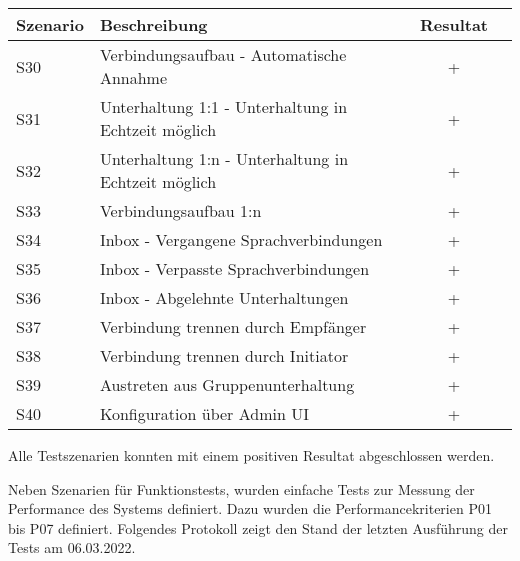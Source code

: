 \begin{table}[h]
    \centering
    \begin{tabular}{|l|p{11cm}|c|c|}
        \hline
        \textbf{Szenario} & \textbf{Beschreibung} & \textbf{Resultat} \\
        \hline
        S30         & Verbindungsaufbau - Automatische Annahme & +\\
        \hline
        S31         & Unterhaltung 1:1 - Unterhaltung in Echtzeit möglich & +\\
        \hline
        S32         & Unterhaltung 1:n - Unterhaltung in Echtzeit möglich & +\\
        \hline
        S33         & Verbindungsaufbau 1:n & +\\
        \hline
        S34         & Inbox - Vergangene Sprachverbindungen & +\\
        \hline
        S35         & Inbox - Verpasste Sprachverbindungen & +\\
        \hline
        S36         & Inbox - Abgelehnte Unterhaltungen & +\\
        \hline
        S37         & Verbindung trennen durch Empfänger & +\\
        \hline
        S38         & Verbindung trennen durch Initiator & +\\
        \hline
        S39         & Austreten aus Gruppenunterhaltung & +\\
        \hline
        S40         & Konfiguration über Admin UI & +\\
        \hline
    \end{tabular}\label{tab:funktion_testplan_2}
\end{table}

Alle Testszenarien konnten mit einem positiven Resultat abgeschlossen werden.

Neben Szenarien für Funktionstests, wurden einfache Tests zur Messung der Performance des Systems definiert.
Dazu wurden die Performancekriterien P01 bis P07 definiert.
Folgendes Protokoll zeigt den Stand der letzten Ausführung der Tests am 06.03.2022.

